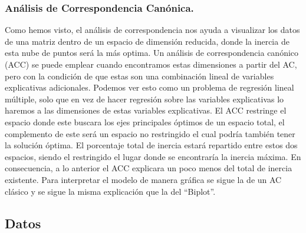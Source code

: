 \hypertarget{anuxe1lisis-de-correspondencia-canuxf3nica.}{%
\subsubsection{Análisis de Correspondencia
Canónica.}\label{anuxe1lisis-de-correspondencia-canuxf3nica.}}

Como hemos visto, el análisis de correspondencia nos ayuda a visualizar
los datos de una matriz dentro de un espacio de dimensión reducida,
donde la inercia de esta nube de puntos será la más optima. Un análisis
de correspondencia canónico (ACC) se puede emplear cuando encontramos
estas dimensiones a partir del AC, pero con la condición de que estas
son una combinación lineal de variables explicativas adicionales.
Podemos ver esto como un problema de regresión lineal múltiple, solo que
en vez de hacer regresión sobre las variables explicativas lo haremos a
las dimensiones de estas variables explicativas. El ACC restringe el
espacio donde este buscara los ejes principales óptimos de un espacio
total, el complemento de este será un espacio no restringido el cual
podría también tener la solución óptima. El porcentaje total de inercia
estará repartido entre estos dos espacios, siendo el restringido el
lugar donde se encontraría la inercia máxima. En consecuencia, a lo
anterior el ACC explicara un poco menos del total de inercia existente.
Para interpretar el modelo de manera gráfica se sigue la de un AC
clásico y se sigue la misma explicación que la del ``Biplot''.

\hypertarget{datos}{%
\subsection{Datos}\label{datos}}



\address{%
William F. Tandazo-Vargas\\
ESPOL\\%
line 1\\ line 2\\
%
%
%
\\\href{mailto:wtandazo@espol.edu.ec}{\nolinkurl{wtandazo@espol.edu.ec}}
}
